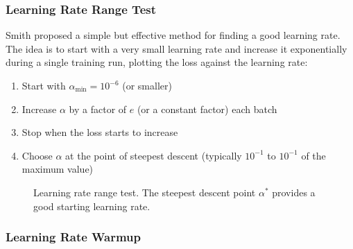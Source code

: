 \subsubsection{Learning Rate Range Test}

Smith \cite{smith2017cyclical} proposed a simple but effective method for finding a good learning rate. The idea is to start with a very small learning rate and increase it exponentially during a single training run, plotting the loss against the learning rate:

\begin{enumerate}
    \item Start with $\alpha_{\min} = 10^{-6}$ (or smaller)
    \item Increase $\alpha$ by a factor of $e$ (or a constant factor) each batch
    \item Stop when the loss starts to increase
    \item Choose $\alpha$ at the point of steepest descent (typically $10^{-1}$ to $10^{-1}$ of the maximum value)
\end{enumerate}

\begin{figure}[htbp]
    \centering
    \caption[Learning rate range test]{Learning rate range test. The steepest descent point $\alpha^*$ provides a good starting learning rate.}
    \label{fig:lr_range_test}
\end{figure}

\subsubsection{Learning Rate Warmup}

